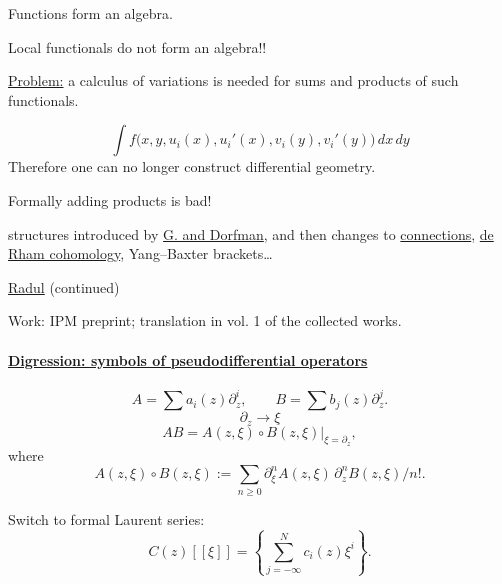 Functions form an algebra.

Local functionals do not form an algebra!!

\underline{Problem:} a calculus of variations is needed for sums and products
of such functionals.

\begin{equation*}
\int f\bigl(x,y,u_i(x),u_i'(x),v_i(y),v_i'(y)\bigr)\,dx\,dy
\end{equation*}
Therefore one can no longer construct differential geometry.

Formally adding products is bad!

\underline{}
structures introduced by \underline{G. and Dorfman}, and
then changes to \underline{connections}, \underline{de Rham cohomology}, Yang--Baxter brackets\ldots

\underline{Radul} (continued)

Work: IPM preprint; translation in vol. 1 of the collected works.

\paragraph*{\underline{Digression: symbols of pseudodifferential operators}}
\begin{equation*}
A=\sum a_i(z)\partial_z^i,\qquad
B=\sum b_j(z)\partial_z^j . \tag{4}
\end{equation*}
\begin{equation*}
\partial_z\longrightarrow\xi
\end{equation*}
\begin{equation*}
AB=\left.A(z,\xi)\circ B(z,\xi)\right|_{\xi=\partial_z}, \tag{5}
\end{equation*}
where
\begin{equation*}
A(z,\xi)\circ B(z,\xi):=
\sum_{n\geq0}\partial_\xi^n A(z,\xi)\,\partial_z^n B(z,\xi)/n!.
\end{equation*}

Switch to formal Laurent series:
\begin{equation*}
C(z)[[\xi]]=\left\{\sum_{j=-\infty}^{N}c_i(z)\xi^i\right\}. \tag{6}
\end{equation*}

